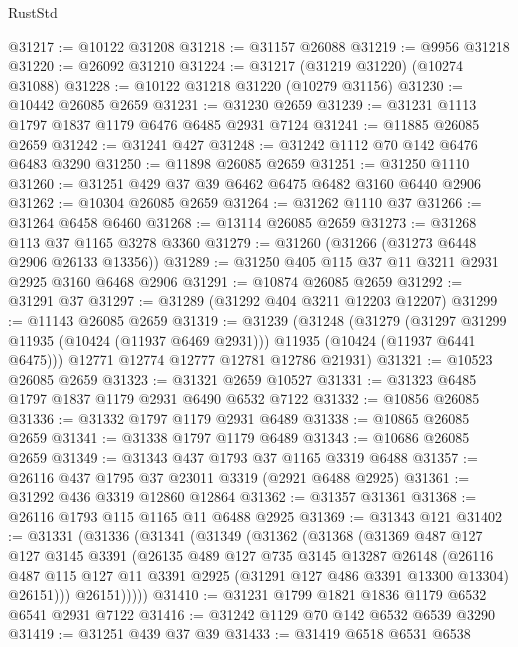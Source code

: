 \begin{lexlean}{RustStd}
\begin{coremodule}
@31217 := @10122 @31208
@31218 := @31157 @26088
@31219 := @9956 @31218
@31220 := @26092 @31210
@31224 := @31217 (@31219 @31220) (@10274 @31088)
@31228 := @10122 @31218 @31220 (@10279 @31156)
@31230 := @10442 @26085 @2659
@31231 := @31230 @2659
@31239 := @31231 @1113 @1797 @1837 @1179 @6476 @6485 @2931 @7124
@31241 := @11885 @26085 @2659
@31242 := @31241 @427
@31248 := @31242 @1112 @70 @142 @6476 @6483 @3290
@31250 := @11898 @26085 @2659
@31251 := @31250 @1110
@31260 := @31251 @429 @37 @39 @6462 @6475 @6482 @3160 @6440 @2906
@31262 := @10304 @26085 @2659
@31264 := @31262 @1110 @37
@31266 := @31264 @6458 @6460
@31268 := @13114 @26085 @2659
@31273 := @31268 @113 @37 @1165 @3278 @3360
@31279 := @31260 (@31266 (@31273 @6448 @2906 @26133 @13356))
@31289 := @31250 @405 @115 @37 @11 @3211 @2931 @2925 @3160 @6468 @2906
@31291 := @10874 @26085 @2659
@31292 := @31291 @37
@31297 := @31289 (@31292 @404 @3211 @12203 @12207)
@31299 := @11143 @26085 @2659
@31319 := @31239
    (@31248
      (@31279
        (@31297 @31299 @11935 (@10424 (@11937 @6469 @2931)))
        @11935
        (@10424 (@11937 @6441 @6475)))
      @12771
      @12774
      @12777
      @12781
      @12786
      @21931)
@31321 := @10523 @26085 @2659
@31323 := @31321 @2659 @10527
@31331 := @31323 @6485 @1797 @1837 @1179 @2931 @6490 @6532 @7122
@31332 := @10856 @26085
@31336 := @31332 @1797 @1179 @2931 @6489
@31338 := @10865 @26085 @2659
@31341 := @31338 @1797 @1179 @6489
@31343 := @10686 @26085 @2659
@31349 := @31343 @437 @1793 @37 @1165 @3319 @6488
@31357 := @26116 @437 @1795 @37 @23011 @3319 (@2921 @6488 @2925)
@31361 := @31292 @436 @3319 @12860 @12864
@31362 := @31357 @31361
@31368 := @26116 @1793 @115 @1165 @11 @6488 @2925
@31369 := @31343 @121
@31402 := @31331
    (@31336
      (@31341
        (@31349
          (@31362
            (@31368
              (@31369
                @487
                @127
                @127
                @3145
                @3391
                (@26135
                  @489
                  @127
                  @735
                  @3145
                  @13287
                  @26148
                  (@26116
                    @487
                    @115
                    @127
                    @11
                    @3391
                    @2925
                    (@31291 @127 @486 @3391 @13300 @13304)
                    @26151)))
              @26151)))))
@31410 := @31231 @1799 @1821 @1836 @1179 @6532 @6541 @2931 @7122
@31416 := @31242 @1129 @70 @142 @6532 @6539 @3290
@31419 := @31251 @439 @37 @39
@31433 := @31419
    @6518
    @6531
    @6538

\end{coremodule}
\end{lexlean}
